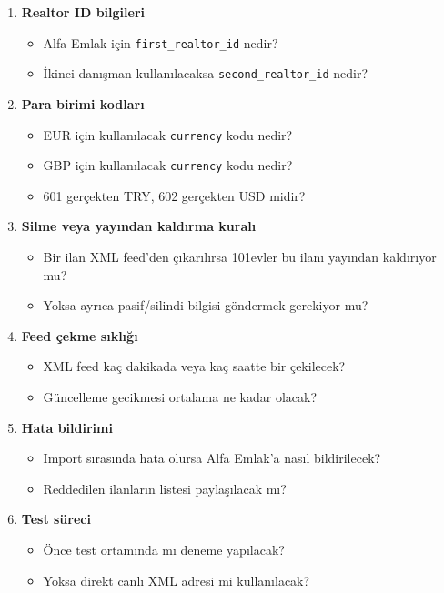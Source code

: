 \documentclass[11pt,a4paper]{article}
\newcommand{\code}[1]{\texttt{#1}}
\begin{document}
\begin{enumerate}
  \item \textbf{Realtor ID bilgileri}
  \begin{itemize}
    \item Alfa Emlak için \code{first\_realtor\_id} nedir?
    \item İkinci danışman kullanılacaksa \code{second\_realtor\_id} nedir?
  \end{itemize}

  \item \textbf{Para birimi kodları}
  \begin{itemize}
    \item EUR için kullanılacak \code{currency} kodu nedir?
    \item GBP için kullanılacak \code{currency} kodu nedir?
    \item 601 gerçekten TRY, 602 gerçekten USD midir?
  \end{itemize}

  \item \textbf{Silme veya yayından kaldırma kuralı}
  \begin{itemize}
    \item Bir ilan XML feed'den çıkarılırsa 101evler bu ilanı yayından kaldırıyor mu?
    \item Yoksa ayrıca pasif/silindi bilgisi göndermek gerekiyor mu?
  \end{itemize}

  \item \textbf{Feed çekme sıklığı}
  \begin{itemize}
    \item XML feed kaç dakikada veya kaç saatte bir çekilecek?
    \item Güncelleme gecikmesi ortalama ne kadar olacak?
  \end{itemize}

  \item \textbf{Hata bildirimi}
  \begin{itemize}
    \item Import sırasında hata olursa Alfa Emlak'a nasıl bildirilecek?
    \item Reddedilen ilanların listesi paylaşılacak mı?
  \end{itemize}

  \item \textbf{Test süreci}
  \begin{itemize}
    \item Önce test ortamında mı deneme yapılacak?
    \item Yoksa direkt canlı XML adresi mi kullanılacak?
  \end{itemize}
\end{enumerate}
\end{document}
